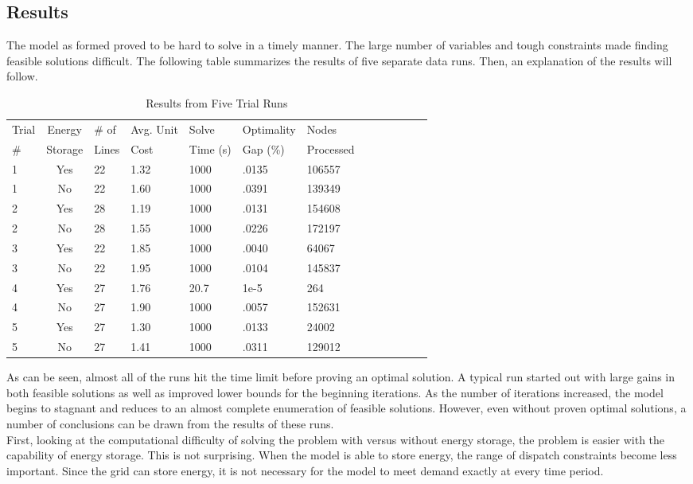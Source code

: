\subsection{Results}
The model as formed proved to be hard to solve in a timely manner. The large number of
variables and tough constraints made finding feasible solutions difficult. The following table summarizes
the results of five separate data runs. Then, an explanation of the results will follow. \\

\begin{table}
\caption{Results from Five Trial Runs}
  \begin{tabular}{ l c  l l l l l l l l l l l }
Trial  	&  Energy  	&  \#  of	&	Avg. Unit	&		Solve	&	Optimality	&	Nodes \\
 \#     	&  Storage 	&  Lines	& 	Cost		&		Time (s) &	Gap (\%)	&	Processed \\
1	& Yes		& 22		&  	1.32		&	 1000	&	 .0135	&	 106557  \\
1	& No	& 22 	& 1.60   &  1000   &    .0391   &   139349  \\
2	& Yes	& 28	& 1.19  & 1000    &    .0131   & 154608  \\
2	&  No   &  28  	& 1.55  & 1000   &  .0226  &   172197  \\
3 	& Yes   & 22   	& 1.85  & 1000  &   .0040  &   64067   \\
3	&  No   & 22   	& 1.95  & 1000  & .0104   &  145837  \\
4	&  Yes  & 27     & 1.76 &  20.7  &  1e-5   & 264	\\
4	&   No  &  27	& 1.90  & 1000  & .0057 & 152631 \\
5	&  Yes & 27 	& 1.30  & 1000  & .0133 & 24002 \\
5	&  No & 27 	& 1.41  & 1000 &  .0311 & 129012
  \end{tabular}
\end{table}

As can be seen, almost all of the runs hit the time limit before proving an optimal solution. A
typical run started out with large gains in both feasible solutions as well as improved lower bounds for
the beginning iterations. As the number of iterations increased, the model begins to stagnant and
reduces to an almost complete enumeration of feasible solutions. However, even without proven
optimal solutions, a number of conclusions can be drawn from the results of these runs.	\\

First, looking at the computational difficulty of solving the problem with versus without energy
storage, the problem is easier with the capability of energy storage. This is not surprising. When the
model is able to store energy, the range of dispatch constraints become less important. Since the grid
can store energy, it is not necessary for the model to meet demand exactly at every time period.	\\

